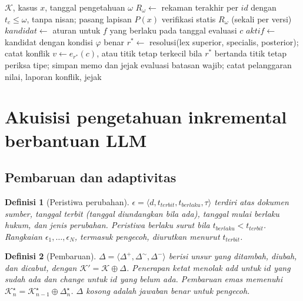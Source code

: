 \documentclass[conference]{IEEEtran}
\makeatletter
\DeclareRobustCommand{\en}[1]{{\usefont{\f@encoding}{\f@family}{\f@series}{it}#1\/}}
\newtheorem{definisi}{Definisi}
\newcommand{\K}{\mathcal{K}}
\newcommand{\emas}{\star}
\makeatother
\begin{document}
\begin{algorithm}[t]
\caption{Inferensi untuk satu pegawai dan satu tahun pajak}
\label{alg:inferensi}
\begin{algorithmic}[1]
\REQUIRE $\K$, kasus $x$, tanggal pengetahuan $\omega$
\STATE $R_\omega \gets$ rekaman terakhir per $\mathit{id}$ dengan $t_c \leq \omega$, tanpa nisan; pasang lapisan $P(x)$
\STATE verifikasi statis $R_\omega$ (sekali per versi)
  \STATE $\mathit{kandidat} \gets$ aturan untuk $f$ yang berlaku pada tanggal evaluasi $c$
  \STATE $\mathit{aktif} \gets$ kandidat dengan kondisi $\varphi$ benar
  \STATE $r^{*} \gets$ resolusi(\en{lex superior}, \en{specialis}, \en{posterior}); catat konflik
  \STATE $v \gets e_{r^{*}}(c)$, atau titik tetap terkecil bila $r^{*}$ bertanda titik tetap
  \STATE periksa tipe; simpan memo dan jejak
\ENDFOR
\STATE evaluasi batasan wajib; catat pelanggaran
\RETURN nilai, laporan konflik, jejak
\end{algorithmic}
\end{algorithm}

\section{Akuisisi pengetahuan inkremental berbantuan LLM}
\label{sec:akuisisi}
\subsection{Pembaruan dan adaptivitas}
\label{subsec:adaptif}

\begin{definisi}[Peristiwa perubahan]
\label{def:peristiwa}
$\epsilon = \langle d, t_{\mathit{terbit}}, t_{\mathit{berlaku}}, \tau \rangle$ terdiri atas dokumen sumber, tanggal terbit (tanggal diundangkan bila ada), tanggal mulai berlaku hukum, dan jenis perubahan. Peristiwa berlaku surut bila $t_{\mathit{berlaku}} < t_{\mathit{terbit}}$. Rangkaian $\epsilon_1, \dots, \epsilon_N$, termasuk pengecoh, diurutkan menurut $t_{\mathit{terbit}}$.
\end{definisi}

\begin{definisi}[Pembaruan]
\label{def:pembaruan}
$\Delta = \langle \Delta^{+}, \Delta^{\sim}, \Delta^{-} \rangle$ berisi unsur yang ditambah, diubah, dan dicabut, dengan $\K' = \K \oplus \Delta$. Penerapan ketat menolak \en{add} untuk $\mathit{id}$ yang sudah ada dan \en{change} untuk $\mathit{id}$ yang belum ada. Pembaruan emas memenuhi $\K^{\emas}_n = \K^{\emas}_{n-1} \oplus \Delta^{\emas}_n$. $\Delta$ kosong adalah jawaban benar untuk pengecoh.
\end{definisi}
\end{document}
